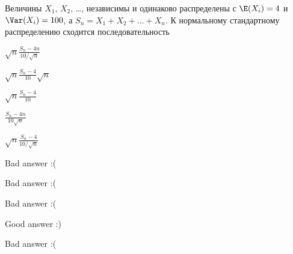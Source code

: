 
\begin{question}
Величины \(X_1\), \(X_2\), \ldots, независимы и одинаково распределены с
\(\E(X_i) = 4\) и \(\Var(X_i) = 100\), а
\(S_n = X_1 + X_2 + \ldots + X_n\). К нормальному стандартному
распределению сходится последовательность
\begin{answerlist}
  \item \(\sqrt{n}\frac{S_n - 4n}{10/\sqrt{n}}\)
  \item \(\sqrt{n}\frac{S_n - 4}{10}\sqrt{n}\)
  \item \(\sqrt{n}\frac{S_n - 4}{10}\)
  \item \(\frac{S_n - 4n}{10\sqrt{n}}\)
  \item \(\sqrt{n}\frac{S_n - 4}{10/\sqrt{n}}\)
\end{answerlist}
\end{question}

\begin{solution}
\begin{answerlist}
  \item Bad answer :(
  \item Bad answer :(
  \item Bad answer :(
  \item Good answer :)
  \item Bad answer :(
\end{answerlist}
\end{solution}

